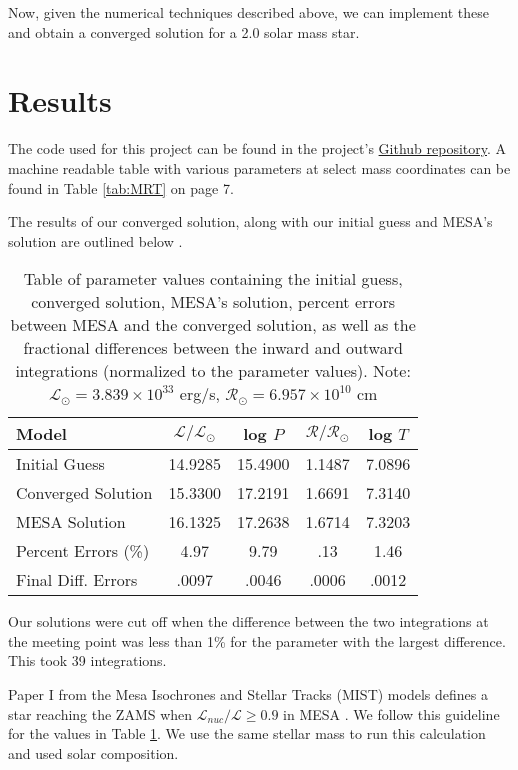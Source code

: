 \documentclass[twocolumn]{aastex631}
\begin{document}
Now, given the numerical techniques described above, we can implement these and obtain a converged solution for a 2.0 solar mass star.

\section{Results}

The code used for this project can be found in the project's \href{https://github.com/pmccreery/ZAMS-code}{Github repository}. A machine readable table with various parameters at select mass coordinates can be found in Table \ref{tab:MRT} on page 7.

The results of our converged solution, along with our initial guess and MESA's solution are outlined below \citep{mesa}.
\begin{table}[ht!]
\centering
\begin{tabular}{ | l | c | c | c | c | }
\hline
Model & $\mathcal{L}/\mathcal{L}_\odot$ & log $P$ & $\mathcal{R}/\mathcal{R}_\odot$ & log $T$ \\
\hline
Initial Guess & 14.9285 & 15.4900 & 1.1487 & 7.0896 \\
\hline
Converged Solution & 15.3300 & 17.2191 & 1.6691 & 7.3140 \\
\hline
MESA Solution & 16.1325 & 17.2638 & 1.6714 & 7.3203 \\
\hline
Percent Errors (\%) & 4.97 & 9.79 & .13 & 1.46 \\
\hline
Final Diff. Errors & .0097 & .0046 & .0006 & .0012 \\
\hline
\end{tabular}
\caption{Table of parameter values containing the initial guess, converged solution, MESA's solution, percent errors between MESA and the converged solution, as well as the fractional differences between the inward and outward integrations (normalized to the parameter values). Note: $\mathcal{L}_\odot = 3.839\times 10^{33} $ erg/s, $\mathcal{R}_\odot = 6.957\times 10^{10} $ cm}
\label{tab:res}
\end{table}


Our solutions were cut off when the difference between the two integrations at the meeting point was less than 1\% for the parameter with the largest difference. This took 39 integrations.

Paper I from the Mesa Isochrones and Stellar Tracks (MIST) models defines a star reaching the ZAMS when $\mathcal{L}_{nuc}/\mathcal{L} \geq 0.9$ in MESA \citep{mist}. We follow this guideline for the values in Table \ref{tab:res}. We use the same stellar mass to run this calculation and used solar composition.
\end{document}
